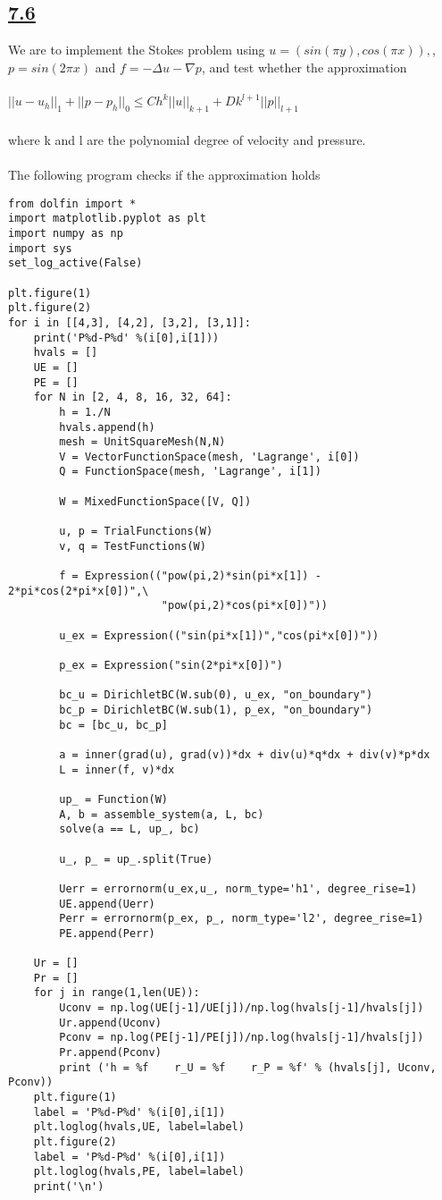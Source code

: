 \documentclass[a4paper,english,12pt,twoside]{article}
\begin{document}
\subsection*{\underline{7.6}}

We are to implement the Stokes problem using $u = (sin(\pi y), cos(\pi x)),$, $p = sin(2\pi x)$ and $f = - \Delta u - \nabla p$, and test whether the approximation\\
\\
$||u - u_h||_1 + ||p - p_h||_0 \leq Ch^k||u||_{k+1} + Dk^{l+1}||p||_{l+1}$\\
\\
where k and l are the polynomial degree of velocity and pressure.\\
\\
The following program checks if the approximation holds
\begin{lstlisting}[style=python, basicstyle = \tiny]
from dolfin import *
import matplotlib.pyplot as plt
import numpy as np
import sys
set_log_active(False)

plt.figure(1)
plt.figure(2)
for i in [[4,3], [4,2], [3,2], [3,1]]:
	print('P%d-P%d' %(i[0],i[1]))
	hvals = []
	UE = []
	PE = []
	for N in [2, 4, 8, 16, 32, 64]:
		h = 1./N
		hvals.append(h)
		mesh = UnitSquareMesh(N,N)
		V = VectorFunctionSpace(mesh, 'Lagrange', i[0])
		Q = FunctionSpace(mesh, 'Lagrange', i[1])

		W = MixedFunctionSpace([V, Q])

		u, p = TrialFunctions(W)
		v, q = TestFunctions(W)

		f = Expression(("pow(pi,2)*sin(pi*x[1]) - 2*pi*cos(2*pi*x[0])",\
				 		"pow(pi,2)*cos(pi*x[0])"))

		u_ex = Expression(("sin(pi*x[1])","cos(pi*x[0])"))

		p_ex = Expression("sin(2*pi*x[0])")

		bc_u = DirichletBC(W.sub(0), u_ex, "on_boundary")
		bc_p = DirichletBC(W.sub(1), p_ex, "on_boundary")
		bc = [bc_u, bc_p]

		a = inner(grad(u), grad(v))*dx + div(u)*q*dx + div(v)*p*dx
		L = inner(f, v)*dx

		up_ = Function(W)
		A, b = assemble_system(a, L, bc)
		solve(a == L, up_, bc)

		u_, p_ = up_.split(True)

		Uerr = errornorm(u_ex,u_, norm_type='h1', degree_rise=1)
		UE.append(Uerr)
		Perr = errornorm(p_ex, p_, norm_type='l2', degree_rise=1)
		PE.append(Perr)

	Ur = []
	Pr = []
	for j in range(1,len(UE)):
		Uconv = np.log(UE[j-1]/UE[j])/np.log(hvals[j-1]/hvals[j])
		Ur.append(Uconv)
		Pconv = np.log(PE[j-1]/PE[j])/np.log(hvals[j-1]/hvals[j])
		Pr.append(Pconv)
		print ('h = %f    r_U = %f    r_P = %f' % (hvals[j], Uconv, Pconv))
	plt.figure(1)
	label = 'P%d-P%d' %(i[0],i[1])
	plt.loglog(hvals,UE, label=label)
	plt.figure(2)
	label = 'P%d-P%d' %(i[0],i[1])
	plt.loglog(hvals,PE, label=label)
	print('\n')


\end{lstlisting}
\end{document}
